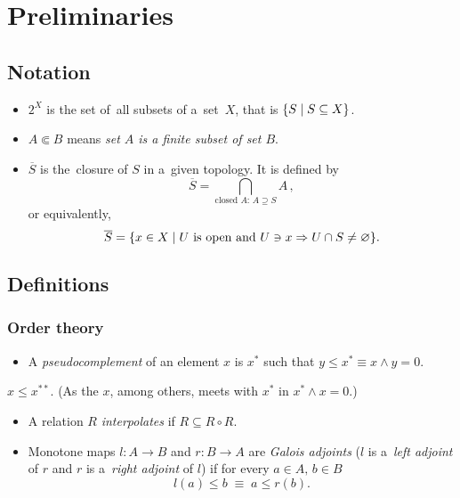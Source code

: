 \chapter{Preliminaries}

\section{Notation}

\begin{itemize}
\item $2^X$ is the set of~all subsets of a~set~$X$, that is $\{ S \mid
S\subseteq X \}$.

\item $A \Subset B$ means {\sl set $A$ is a finite subset of set $B$\/}.

\item $\overline{S}$ is the~closure of $S$ in a~given topology.
It is defined by
\[
  \overline{S} = \bigcap_{ \text{closed } A\colon \, A\supseteq S} A
  \, ,
\]
or equivalently,
\[
  \overline{S} = \{ x \in X \mid U \text{ is open and } U\owns x \Rightarrow U
  \cap S \ne \varnothing \}.
\]

\end{itemize}

\section{Definitions}

\subsection*{Order theory}

\begin{itemize}
\item A \emph{pseudocomplement} of an element $x$ is $x^*$ such that $y \le x^*
\equiv x \wedge y = 0$.
\end{itemize}

\begin{fact}
  $x \le x^{**}$.
  (As the $x$, among others, meets with $x^*$ in $x^* \wedge x = 0$.)
\end{fact}

\begin{itemize}
\item A relation $R$ \emph{interpolates} if $R \subseteq R \circ R$.

\item Monotone maps $l\colon A \to B$ and $r\colon B \to A$ are \emph{Galois
  adjoints\/} ($l$ is a~\emph{left adjoint\/} of $r$ and $r$ is a~\emph{right
  adjoint\/} of $l$) if for every $a\in A, \, b\in B$
  \[
    l(a) \le b \; \equiv \; a \le r(b).
  \]
\end{itemize}

